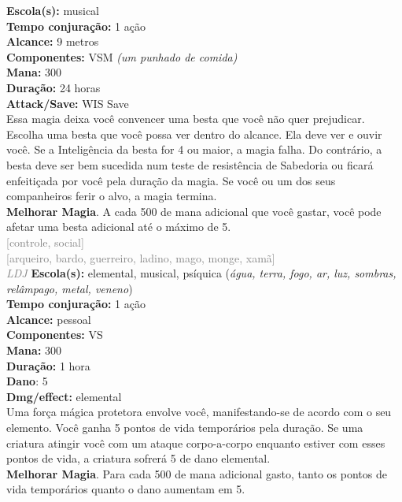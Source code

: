 \documentclass{RPG_Adventure}[2021/10/20]
\begin{document}
{\small \t \textbf{Escola(s):} musical\\\t \textbf{Tempo conjuração:} 1 ação\\\t \textbf{Alcance:} 9 metros\\\t \textbf{Componentes:} VSM \textit{(um punhado de comida)}\\\t \textbf{Mana:} 300\\\t \textbf{Duração:} 24 horas\\\t \textbf{Attack/Save:} WIS Save\\}
{\normalsize Essa magia deixa você convencer uma besta que você não quer prejudicar. Escolha uma besta que você possa ver dentro do alcance. Ela deve ver e ouvir você. Se a Inteligência da besta for 4 ou maior, a magia falha. Do contrário, a besta deve ser bem sucedida num teste de resistência de Sabedoria ou ficará enfeitiçada por você pela duração da magia. Se você ou um dos seus companheiros ferir o alvo, a magia termina.\\\t \textbf{Melhorar Magia}. A cada 500 de mana adicional que você gastar, você pode afetar uma besta adicional até o máximo de 5.\\}
{\scriptsize \textcolor{gray}{[controle, social]\\}}
{\scriptsize \textcolor{gray}{[arqueiro, bardo, guerreiro, ladino, mago, monge, xamã]\\}}
{\tiny \textcolor{gray}{\textit{LDJ}}}\jump{}
{\small \t \textbf{Escola(s):} elemental, musical, psíquica (\textit{água, terra, fogo, ar, luz, sombras, relâmpago, metal, veneno})\\\t \textbf{Tempo conjuração:} 1 ação\\\t \textbf{Alcance:} pessoal\\\t \textbf{Componentes:} VS\\\t \textbf{Mana:} 300\\\t \textbf{Duração:} 1 hora\\\t \textbf{Dano}: 5\\\t \textbf{Dmg/effect:} elemental\\}
{\normalsize Uma força mágica protetora envolve você, manifestando-se de acordo com o seu elemento. Você ganha 5 pontos de vida temporários pela duração. Se uma criatura atingir você com um ataque corpo-a-corpo enquanto estiver com esses pontos de vida, a criatura sofrerá 5 de dano elemental.\\\t \textbf{Melhorar Magia}. Para cada 500 de mana adicional gasto, tanto os pontos de vida temporários quanto o dano aumentam em 5.\\}
\end{document}
